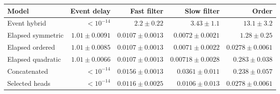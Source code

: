 \begin{tabular}{lrrrr}\toprule
Model & Event delay & Fast filter & Slow filter & Order \\\midrule
Event hybrid & $<10^{-14}$ & $2.2 \pm 0.22$ & $3.43 \pm 1.1$ & $13.1 \pm 3.2$ \\
Elapsed symmetric & $1.01 \pm 0.0091$ & $0.0107 \pm 0.0013$ & $0.0072 \pm 0.0021$ & $1.28 \pm 0.25$ \\
Elapsed ordered & $1.01 \pm 0.0085$ & $0.0107 \pm 0.0013$ & $0.0071 \pm 0.0022$ & $0.0278 \pm 0.0061$ \\
Elapsed quadratic & $1.01 \pm 0.0066$ & $0.0107 \pm 0.0013$ & $0.00718 \pm 0.0028$ & $0.283 \pm 0.038$ \\
Concatenated & $<10^{-14}$ & $0.0156 \pm 0.0013$ & $0.0361 \pm 0.011$ & $0.238 \pm 0.057$ \\
Selected heads & $<10^{-14}$ & $0.0116 \pm 0.0025$ & $0.0106 \pm 0.013$ & $0.0278 \pm 0.0061$ \\
\bottomrule\end{tabular}
